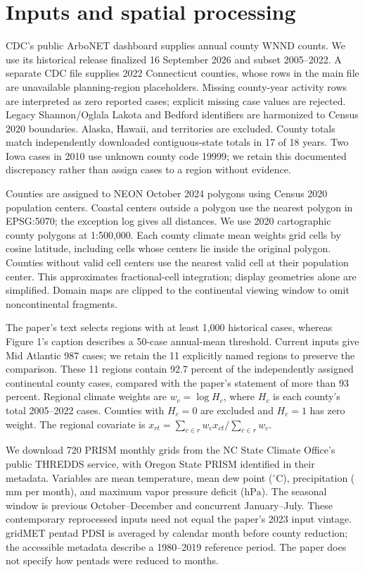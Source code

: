 \documentclass[11pt]{article}
\begin{document}
\section{Inputs and spatial processing}
CDC's public ArboNET dashboard supplies annual county WNND counts. We use its
historical release finalized 16 September 2026 and subset 2005--2022. A separate
CDC file supplies 2022 Connecticut counties, whose rows in the main file are
unavailable planning-region placeholders. Missing county-year activity rows are
interpreted as zero reported cases; explicit missing case values are rejected.
Legacy Shannon/Oglala Lakota and Bedford identifiers are harmonized to Census 2020
boundaries. Alaska, Hawaii, and territories are excluded. County totals match
independently downloaded contiguous-state totals in 17 of 18 years. Two Iowa cases
in 2010 use unknown county code 19999; we retain this documented discrepancy
rather than assign cases to a region without evidence.

Counties are assigned to NEON October 2024 polygons using Census 2020 population
centers. Coastal centers outside a polygon use the nearest polygon in EPSG:5070;
the exception log gives all distances. We use 2020 cartographic county polygons at
1:500,000. Each county climate mean weights grid cells by cosine latitude, including
cells whose centers lie inside the original polygon. Counties without valid cell
centers use the nearest valid cell at their population center. This approximates
fractional-cell integration; display geometries alone are simplified. Domain maps
are clipped to the continental viewing window to omit noncontinental fragments.

The paper's text selects regions with at least 1,000 historical cases, whereas
Figure 1's caption describes a 50-case annual-mean threshold. Current inputs give
Mid Atlantic 987 cases; we retain the 11 explicitly named regions to preserve the
comparison. These 11 regions contain 92.7 percent of the independently assigned
continental county cases, compared with the paper's statement of more than
93 percent. Regional climate weights are $w_c=\log H_c$, where $H_c$ is each county's
total 2005--2022 cases. Counties with $H_c=0$ are excluded and $H_c=1$ has zero weight.
The regional covariate is $x_{rt}=\sum_{c\in r}w_c x_{ct}/\sum_{c\in r}w_c$.

We download 720 PRISM monthly grids from the NC State Climate Office's public
THREDDS service, with Oregon State PRISM identified in their metadata. Variables
are mean temperature, mean dew point (${}^\circ\mathrm{C}$), precipitation
($\mathrm{mm}$ per month), and maximum vapor pressure deficit ($\mathrm{hPa}$).
The seasonal window is previous October--December and concurrent January--July.
These contemporary reprocessed inputs need not equal the paper's 2023 input vintage.
gridMET pentad PDSI is averaged by calendar month before county reduction; the
accessible metadata describe a 1980--2019 reference period. The paper does not
specify how pentads were reduced to months.
\end{document}
